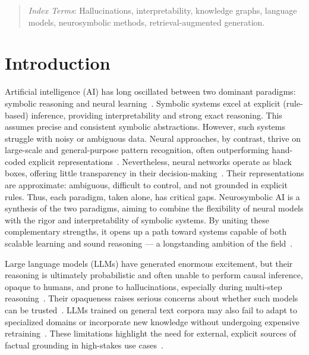 \documentclass[10pt]{article}
\begin{document}
\begin{abstract}
\vspace*{2mm}
\noindent
\textit{Index Terms}: Hallucinations, interpretability, knowledge graphs, language models, neurosymbolic methods, retrieval-augmented generation.

\end{abstract}

\section{Introduction}
\label{intro}

Artificial intelligence (AI) has long oscillated between two dominant paradigms: symbolic reasoning and neural learning~\citep{shavlik1991symbolic, AvilaGarcez2002}. Symbolic systems excel at explicit (rule-based) inference, providing interpretability and strong exact reasoning. This assumes precise and consistent symbolic abstractions. However, such systems struggle with noisy or ambiguous data. Neural approaches, by contrast, thrive on large-scale and general-purpose pattern recognition, often outperforming hand-coded explicit representations~\cite{sutton2019bitter}. Nevertheless, neural networks operate as black boxes, offering little transparency in their decision-making~\cite{sharkey2025open}. Their representations are approximate: ambiguous, difficult to control, and not grounded in explicit rules. Thus, each paradigm, taken alone, has critical gaps. Neurosymbolic AI is a synthesis of the two paradigms, aiming to combine the flexibility of neural models with the rigor and interpretability of symbolic systems. By uniting these complementary strengths, it opens up a path toward systems capable of both scalable learning and sound reasoning --- a longstanding ambition of the field~\cite{neurosymboic_3rd, towell1994using, garcez2019neuralsymbolic_methodology}.


Large language models (LLMs) have generated enormous excitement, but their reasoning is ultimately probabilistic and often unable to perform causal inference, opaque to humans, and prone to hallucinations, especially during multi-step reasoning~\cite{marcus2018_dl_critical, 10.1145/3571730}. Their opaqueness raises serious concerns about whether such models can be trusted~\cite{vonEschenbach2021transparency, 10.1155/2023/4459198}. LLMs trained on general text corpora may also fail to adapt to specialized domains or incorporate new knowledge without undergoing expensive retraining~\cite{zhao2025survey-llms}. These limitations highlight the need for external, explicit sources of factual grounding in high-stakes use cases~\cite{fan_rag_survey2024}.
\end{document}
